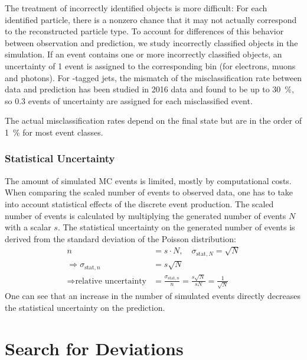 The treatment of incorrectly identified objects is more difficult: For each identified particle, there is a nonzero chance that it may not actually correspond to the reconstructed particle type. To account for differences of this behavior between observation and prediction, we study incorrectly classified objects in the simulation. If an event contains one or more incorrectly classified objects, an uncertainty of \num{1} event is assigned to the corresponding bin (for electrons, muons and photons). 
For \Pqb-tagged jets, the mismatch of the misclassification rate between data and prediction has been studied in 2016 data and found to be up to \SI{30}{\percent}\cite[Fig. 73]{CMS:CMS-AN-2017-018}, so \num{0.3} events of uncertainty are assigned for each misclassified event. 

The actual misclassification rates depend on the final state but are in the order of \SI{1}{\percent} for most event classes.

\subsubsection{Statistical Uncertainty}
The amount of simulated \ac{MC} events is limited, mostly by computational costs. When comparing the scaled number of events to observed data, one has to take into account statistical effects of the discrete event production. The scaled number of events is calculated by multiplying the generated number of events $N$ with a scalar $s$. The statistical uncertainty on the generated number of events is derived from the standard deviation of the Poisson distribution: 
\begin{align}
    n &= s \cdot N, \quad \sigma_{\text{stat}, N} = \sqrt{N} \\
    \Rightarrow \sigma_{\text{stat}, n} &= s \sqrt{N} \\
    \Rightarrow \text{relative uncertainty} &= \frac{\sigma_{\text{stat}, n}}{n} = \frac{s \sqrt{N}}{s N} = \frac{1}{\sqrt{N}}
\end{align}
One can see that an increase in the number of simulated events directly decreases the statistical uncertainty on the prediction.

\section{Search for Deviations}
\label{sec:deviations_search}

\newcommand{\TS}{\ensuremath{\uptheta}\xspace}
\newcommand{\TSmin}{\ensuremath{\uptheta_\text{min}}\xspace}


